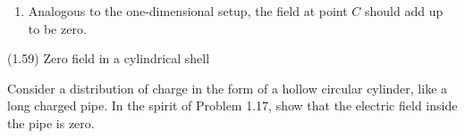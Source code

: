 \documentclass{article}
\begin{document}
\begin{homeworkProblem}
{\begin{enumerate}[label=(\alph*)]
\begin{item}
				Therefore, the contribution of the two elements $A$ and $B$ has the same magnitude and opposite direction. They cancel each other. Field $\mathbf{E}$ vanished at point $C$.
			\end{item}
			\item Analogous to the one-dimensional setup, the field at point $C$ should add up to be zero.
		\end{enumerate}
	}
\end{homeworkProblem}


\begin{homeworkProblem}
	(1.59) Zero field in a cylindrical shell

	Consider a distribution of charge in the form of a hollow circular cylinder, like a long charged pipe. In the spirit of Problem 1.17, show that the electric field inside the pipe is zero.

\end{homeworkProblem}

\end{document}
